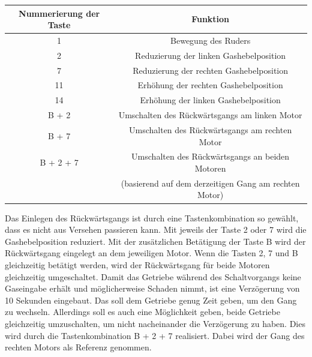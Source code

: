 \begin{table}[H]
    \begin{tabular}{|c|c|}
    \hline
    \rowcolor[gray]{0.8}
     Nummerierung der Taste & Funktion \\ \hline 
     1 & Bewegung des Ruders \\ \hline 
     2 & Reduzierung der linken Gashebelposition \\ \hline 
     7 & Reduzierung der rechten Gashebelposition \\ \hline
     11 & Erhöhung der rechten Gashebelposition \\ \hline
     14 & Erhöhung der linken Gashebelposition \\ \hline
     B + 2 & Umschalten des Rückwärtsgangs am linken Motor \\ \hline
     B + 7 & Umschalten des Rückwärtsgangs am rechten Motor \\ \hline
     B + 2 + 7 & Umschalten des Rückwärtsgangs an beiden Motoren \\
      & (basierend auf dem derzeitigen Gang am rechten Motor) \\ \hline
    \end{tabular}
\end{table}
Das Einlegen des Rückwärtsgangs ist durch eine Tastenkombination so gewählt, dass es nicht aus Versehen passieren kann.
Mit jeweils der Taste 2 oder 7 wird die Gashebelposition reduziert. Mit der zusätzlichen Betätigung der Taste B wird der 
Rückwärtsgang eingelegt an dem jeweiligen Motor. Wenn die Tasten 2, 7 und B gleichzeitig betätigt werden, 
wird der Rückwärtsgang für beide Motoren gleichzeitig umgeschaltet.
Damit das Getriebe während des Schaltvorgangs keine Gaseingabe erhält und möglicherweise Schaden nimmt, 
ist eine Verzögerung von 10 Sekunden eingebaut. 
Das soll dem Getriebe genug Zeit geben, um den Gang zu wechseln.
Allerdings soll es auch eine Möglichkeit geben, beide Getriebe gleichzeitig umzuschalten, um nicht 
nacheinander die Verzögerung zu haben. Dies wird durch die Tastenkombination B + 2 + 7 realisiert.
Dabei wird der Gang des rechten Motors als Referenz genommen. \\


